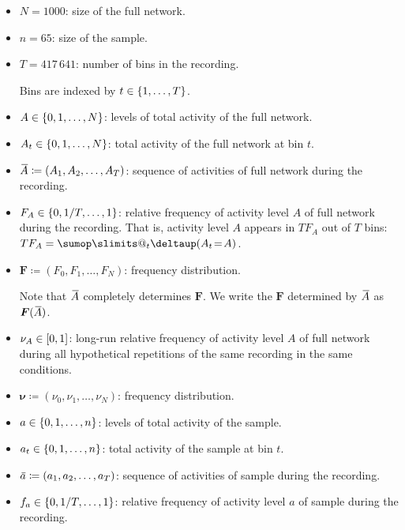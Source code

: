 \documentclass[\ifafour a4paper,12pt,\else a5paper,10pt,\fi%
onecolumn,oneside,article,%
british%
]{memoir}
\makeatletter
\theoremstyle{remark}
\theoremstyle{innote}
\def\sum{\DOTSI\sumop\slimits@}
\newcommand*{\delt}{\deltaup}%
\newcommand*{\defd}{\coloneqq}
\DeclarePairedDelimiter\clcl{[}{]}
\DeclarePairedDelimiter\set{\{}{\}}
\renewcommand*{\|}[1][]{\nonscript\,#1\vert\nonscript\;\mathopen{}}
\newcommand*{\widebar}[1]{{\mkern1.5mu\skew{2}\overline{\mkern-1.5mu#1\mkern-1.5mu}\mkern 1.5mu}}
\newcommand*{\yFF}{F}
\newcommand*{\yF}{\bm{\yFF}}
\newcommand*{\yAs}{\widebar{A}}%
\newcommand*{\yas}{\widebar{a}}%
\newcommand*{\ynuu}{\nu}
\newcommand*{\ynu}{\bm{\ynuu}}
\newcommand*{\yeq}{\mathrel{\!=\!}}
\makeatother
\begin{document}
\begin{itemize}[wide,label={}]
\item $N=1000$: size of the full network.

\item $n=65$: size of the sample.

\item $T=417\,641$: number of bins in the recording.

Bins are indexed by $t\in\set{1,\dotsc,T}$.

\item $A\in\set{0,1,\dotsc,N}$: levels of total activity of the full network.

\item $A_{t}\in\set{0,1,\dotsc,N}$: total activity of the full network at bin $t$.

\item $\yAs \defd (A_{1}, A_{2}, \dotsc, A_{T})$: sequence of activities of full
network during the recording.

\item $F_{A} \in \set{0,1/T,\dotsc,1}$: relative frequency of activity level $A$
of full network during the recording. That is, activity level $A$ appears
in $T F_{A}$ out of $T$ bins: $T F_{A} = \sum_{t}\delt(A_{t}\yeq A)$.

\item $\yF \defd (F_{0},F_{1}, \dotsc,F_{N})$: frequency distribution.

  Note that $\yAs$ completely determines $\yF$. We write the $\yF$
  determined by $\yAs$ as $\yF(\yAs)$.

\item $\nu_{A} \in \clcl{0,1}$: long-run relative frequency of activity level $A$
of full network during all hypothetical repetitions of the same recording
in the same conditions.

\item $\ynu \defd (\nu_{0}, \nu_{1}, \dotsc, \nu_{N})$: frequency distribution.

\item $a\in\set{0,1,\dotsc,n}$: levels of total activity of the sample.

\item $a_{t}\in\set{0,1,\dotsc,n}$: total activity of the sample at bin $t$.

\item $\yas \defd (a_{1}, a_{2}, \dotsc, a_{T})$: sequence of activities of
sample during the recording.

\item $f_{a} \in \set{0,1/T,\dotsc,1}$: relative frequency of activity level $a$
of sample during the recording.


\end{itemize}
\end{document}
